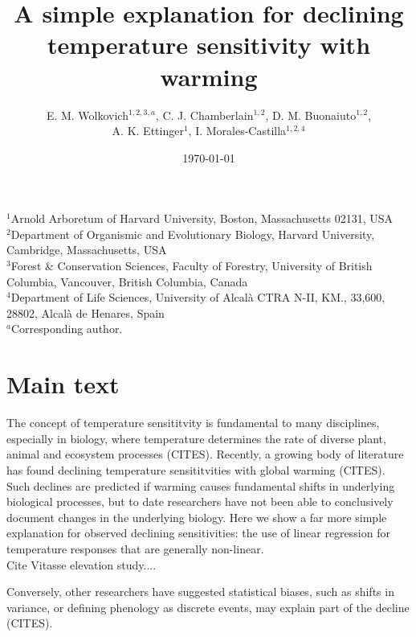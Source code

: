 \documentclass[11pt,letter]{article}
\begin{document}
% 

\title{A simple explanation for declining temperature sensitivity with warming} %
\author{E. M. Wolkovich$^{1,2,3,a}$, C. J. Chamberlain$^{1,2}$, D. M. Buonaiuto$^{1,2}$, \\ A. K. Ettinger$^1$, I. Morales-Castilla$^{1,2,4}$} %

\date{\today} 
\maketitle
$^1$Arnold Arboretum of Harvard University, Boston, Massachusetts 02131, USA\\
$^2$Department of Organismic and Evolutionary Biology, Harvard University, Cambridge, Massachusetts, USA\\
$^3$Forest \& Conservation Sciences, Faculty of Forestry, University of British Columbia, Vancouver, British Columbia, Canada\\
$^4$Department of Life Sciences, University of Alcal\`a CTRA N-II, KM., 33,600, 28802, Alcal\`a de Henares, Spain\\
$^a$Corresponding author.

\section{Main text}

The concept of temperature sensititvity is fundamental to many disciplines, especially in biology, where temperature determines the rate of diverse plant, animal and ecosystem processes (CITES). Recently, a growing body of literature has found declining temperature sensititvities with global warming (CITES). Such declines are predicted if warming causes fundamental shifts in underlying biological processes, but to date researchers have not been able to conclusively document changes in the underlying biology. Here we show a far more simple explanation for observed declining sensitivities: the use of linear regression for temperature responses that are generally non-linear. \\

Cite Vitasse elevation study....

Conversely, other researchers have suggested statistical biases, such as shifts in variance, or defining phenology as discrete events, may explain part of the decline (CITES).
\end{document}
